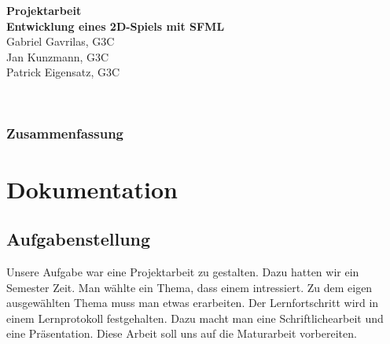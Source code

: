 \documentclass[11pt,a4paper]{scrbook}
\begin{document}
\begin{titlepage}
\begin{center}

\vspace*{3cm}
\textbf{\huge{Projektarbeit}}\\
\vspace*{2cm}
\textbf{\large{Entwicklung eines 2D-Spiels mit SFML}}\\
\vspace*{5cm}
Gabriel Gavrilas, G3C\\
Jan Kunzmann, G3C\\
Patrick Eigensatz, G3C
\end{center}
\end{titlepage}

\pagestyle{fancy}

\clearpage

\pagestyle{empty}

\mbox{ }
\clearpage

\setcounter{page}{1}
\section*{Zusammenfassung}


\tableofcontents

\part{Dokumentation}
\chapter{Aufgabenstellung} 
Unsere Aufgabe war eine Projektarbeit zu gestalten. Dazu hatten wir ein Semester Zeit. Man wählte ein Thema, dass einem intressiert. 
Zu dem eigen ausgewählten Thema muss man etwas erarbeiten. Der Lernfortschritt wird in einem Lernprotokoll festgehalten.
Dazu macht man eine Schriftlichearbeit und eine Präsentation. Diese Arbeit soll uns auf die Maturarbeit
vorbereiten.
\end{document}
